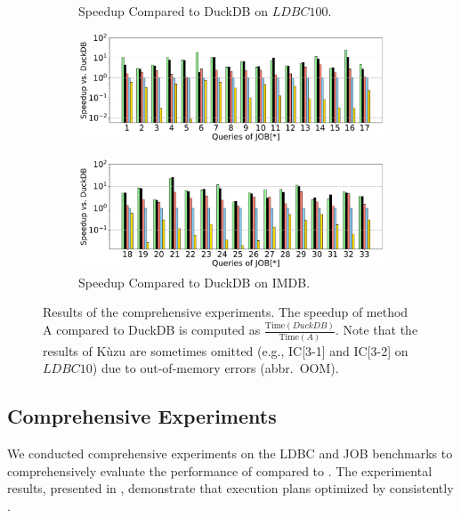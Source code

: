 \begin{figure}[ht]
\begin{subfigure}[b]{\linewidth}
        \vspace{-2em}
        \caption{Speedup Compared to DuckDB on $LDBC100$.}
        \label{fig:exp-e2e-sf30}
    \end{subfigure}
    \begin{subfigure}[b]{\linewidth}
        \centering
        \includegraphics[width=\linewidth]{./figures/exp/e2e_job_part1.pdf}
        \vspace*{-2ex}
    \end{subfigure}
    \begin{subfigure}[b]{\linewidth}
        \centering
        \includegraphics[width=\linewidth]{./figures/exp/e2e_job_part2.pdf}
        \vspace{-2em}
        \caption{Speedup Compared to DuckDB on IMDB.}
        \label{fig:exp-e2e-job}
    \end{subfigure}
    \caption{Results of the comprehensive experiments. The speedup of method A compared to DuckDB is computed as $\frac{\text{Time}(DuckDB)}{\text{Time}(A)}$. Note that the results of K\`uzu are sometimes omitted (e.g., IC[3-1] and IC[3-2] on $LDBC10$) due to out-of-memory errors (abbr.~OOM).}
    \label{fig:exp-e2e}
\end{figure}

\subsection{Comprehensive Experiments}
\label{sec:experiment-e2e}

We conducted comprehensive experiments on the LDBC and JOB benchmarks to comprehensively evaluate the performance of \name compared to . The experimental results, presented in , demonstrate that execution plans optimized by \name consistently .

